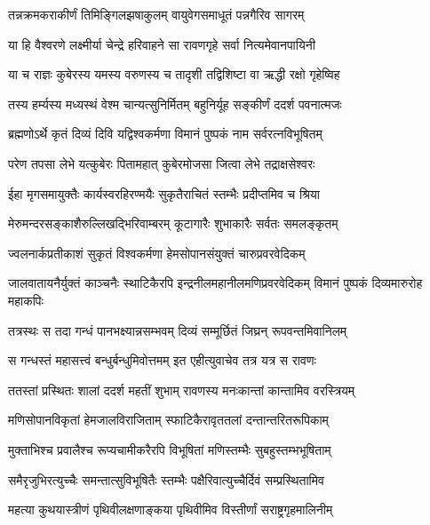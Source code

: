 \twolineshloka
{तन्नक्रमकराकीर्णं तिमिङ्गिलझषाकुलम्}
{वायुवेगसमाधूतं पन्नगैरिव सागरम्} %

\twolineshloka
{या हि वैश्वरणे लक्ष्मीर्या चेन्द्रे हरिवाहने}
{सा रावणगृहे सर्वा नित्यमेवानपायिनी} %

\twolineshloka
{या च राज्ञः कुबेरस्य यमस्य वरुणस्य च}
{तादृशी तद्विशिष्टा वा ऋद्धी रक्षो गृहेष्विह} %

\twolineshloka
{तस्य हर्म्यस्य मध्यस्थं वेश्म चान्यत्सुनिर्मितम्}
{बहुनिर्यूह सङ्कीर्णं ददर्श पवनात्मजः} %

\twolineshloka
{ब्रह्मणोऽर्थे कृतं दिव्यं दिवि यद्विश्वकर्मणा}
{विमानं पुष्पकं नाम सर्वरत्नविभूषितम्} %

\twolineshloka
{परेण तपसा लेभे यत्कुबेरः पितामहात्}
{कुबेरमोजसा जित्वा लेभे तद्राक्षसेश्वरः} %

\twolineshloka
{ईहा मृगसमायुक्तैः कार्यस्वरहिरण्मयैः}
{सुकृतैराचितं स्तम्भैः प्रदीप्तमिव च श्रिया} %

\twolineshloka
{मेरुमन्दरसङ्काशैरुल्लिखद्भिरिवाम्बरम्}
{कूटागारैः शुभाकारैः सर्वतः समलङ्कृतम्} %

\twolineshloka
{ज्वलनार्कप्रतीकाशं सुकृतं विश्वकर्मणा}
{हेमसोपानसंयुक्तं चारुप्रवरवेदिकम्} %

\threelineshloka
{जालवातायनैर्युक्तं काञ्चनैः स्थाटिकैरपि}
{इन्द्रनीलमहानीलमणिप्रवरवेदिकम्}
{विमानं पुष्पकं दिव्यमारुरोह महाकपिः} %

\twolineshloka
{तत्रस्थः स तदा गन्धं पानभक्ष्यान्नसम्भवम्}
{दिव्यं सम्मूर्छितं जिघ्रन् रूपवन्तमिवानिलम्} %

\twolineshloka
{स गन्धस्तं महासत्त्वं बन्धुर्बन्धुमिवोत्तमम्}
{इत एहीत्युवाचेव तत्र यत्र स रावणः} %

\twolineshloka
{ततस्तां प्रस्थितः शालां ददर्श महतीं शुभाम्}
{रावणस्य मनःकान्तां कान्तामिव वरस्त्रियम्} %

\twolineshloka
{मणिसोपानविकृतां हेमजालविराजिताम्}
{स्फाटिकैरावृततलां दन्तान्तरितरूपिकाम्} %

\twolineshloka
{मुक्ताभिश्च प्रवालैश्च रूप्यचामीकरैरपि}
{विभूषितां मणिस्तम्भैः सुबहुस्तम्भभूषिताम्} %

\twolineshloka
{समैरृजुभिरत्युच्चैः समन्तात्सुविभूषितैः}
{स्तम्भैः पक्षैरिवात्युच्चैर्दिवं सम्प्रस्थितामिव} %

\twolineshloka
{महत्या कुथयास्त्रीणं पृथिवीलक्षणाङ्कया}
{पृथिवीमिव विस्तीर्णां सराष्ट्रगृहमालिनीम्} %

